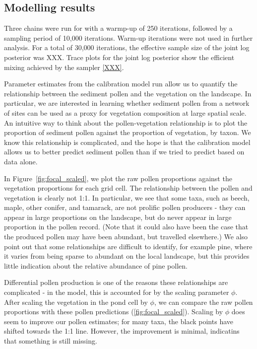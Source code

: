 \documentclass[12pt]{article}
\begin{document}
\subsection{Modelling results}

Three chains were run for with a warmp-up of 250 iterations, followed
by a sampling period of 10,000 iterations. Warm-up iterations were not
used in further analysis. For a total of 30,000 iterations, the
effective sample size of the joint log posterior was XXX. Trace plots
for the joint log posterior show the efficient mixing achieved by the
sampler \ref{XXX}.

Parameter estimates from the calibration model run allow us to
quantify the relationship between the sediment pollen and the
vegetation on the landscape. In particular, we are interested in
learning whether sediment pollen from a network of sites can be used
as a proxy for vegetation composition at large spatial scale. An
intuitive way to think about the pollen-vegetation relationship is to
plot the proportion of sediment pollen against the proportion of
vegetation, by taxon. We know this relationship is complicated, and
the hope is that the calibration model allows us to better predict
sediment pollen than if we tried to predict based on data alone. 

In Figure~\ref{fig:focal_scaled}, we plot the raw pollen proportions
against the vegetation proportions for each grid cell. The
relationship between the pollen and vegetation is clearly not 1:1. In
particular, we see that some taxa, such as beech, maple, other
conifer, and tamarack, are not prolific pollen producers - they can
appear in large proportions on the landscape, but do never appear in
large proportion in the pollen record. (Note that it could also have
been the case that the produced pollen may have been abundant, but
travelled elsewhere.) We also point out that some relationships are
difficult to identify, for example pine, where it varies from being
sparse to abundant on the local landscape, but this provides little
indication about the relative abundance of pine pollen.

Differential pollen production is one of the reasons these
relationships are complicated - in the model, this is accounted for by
the scaling parameter $\phi$. After scaling the vegetation in the pond
cell by $\phi$, we can compare the raw pollen proportions with these
pollen predictions (\ref{fig:focal_scaled}). Scaling by $\phi$ does seem to improve our pollen estimates; for many taxa, the black points have shifted towards the 1:1 line. However, the improvement is minimal, indicatins that something is still missing.
\end{document}

